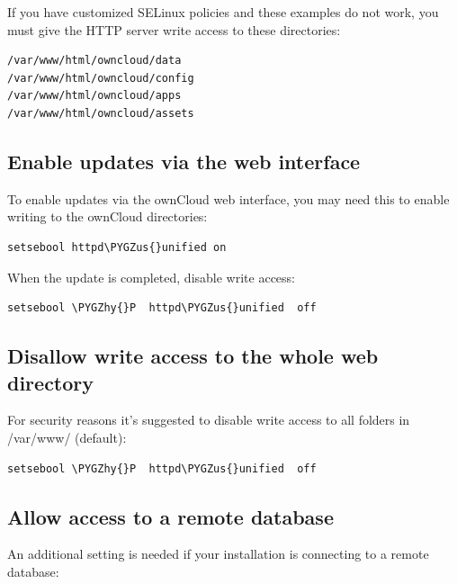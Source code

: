 \documentclass[letterpaper,10pt,english]{sphinxmanual}
\def\PYGZus{\char`\_}
\def\PYGZhy{\char`\-}
\begin{document}
If you have customized SELinux policies and these examples do not work, you must give the
HTTP server write access to these directories:

\begin{Verbatim}[commandchars=\\\{\}]
/var/www/html/owncloud/data
/var/www/html/owncloud/config
/var/www/html/owncloud/apps
/var/www/html/owncloud/assets
\end{Verbatim}


\subsection{Enable updates via the web interface}
\label{installation/selinux_configuration:enable-updates-via-the-web-interface}
To enable updates via the ownCloud web interface, you may need this to enable writing to the ownCloud directories:

\begin{Verbatim}[commandchars=\\\{\}]
setsebool httpd\PYGZus{}unified on
\end{Verbatim}

When the update is completed, disable write access:

\begin{Verbatim}[commandchars=\\\{\}]
setsebool \PYGZhy{}P  httpd\PYGZus{}unified  off
\end{Verbatim}


\subsection{Disallow write access to the whole web directory}
\label{installation/selinux_configuration:disallow-write-access-to-the-whole-web-directory}
For security reasons it's suggested to disable write access to all folders in /var/www/ (default):

\begin{Verbatim}[commandchars=\\\{\}]
setsebool \PYGZhy{}P  httpd\PYGZus{}unified  off
\end{Verbatim}


\subsection{Allow access to a remote database}
\label{installation/selinux_configuration:allow-access-to-a-remote-database}
An additional setting is needed if your installation is connecting to a remote database:
\end{document}
